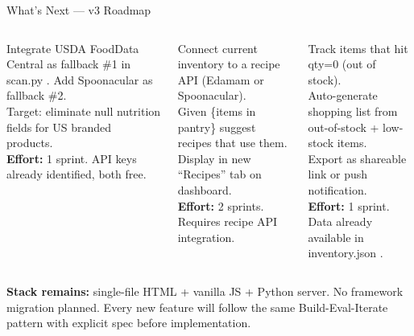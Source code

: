 \documentclass[aspectratio=169,12pt]{beamer}
\newcommand{\codebox}[1]{%
  \colorbox{cardBg}{\small\ttfamily #1}%
}
\begin{document}
\begin{frame}[t,shrink=25]{What's Next --- v3 Roadmap}
  \begin{columns}[T]
      \begin{tcolorbox}[pantrybox,title={Nutrition Enrichment}]
        {\footnotesize
        Integrate USDA FoodData Central as fallback \#1 in \codebox{scan.py}.
        Add Spoonacular as fallback \#2.\\[4pt]
        Target: eliminate null nutrition fields for US branded products.\\[4pt]
        \textbf{Effort:} 1 sprint. API keys already identified, both free.
        }
      \end{tcolorbox}

      \begin{tcolorbox}[pantrybox,title={Recipe Database}]
        {\footnotesize
        Connect current inventory to a recipe API (Edamam or Spoonacular).\\[4pt]
        Given \{items in pantry\} \textrightarrow{} suggest recipes that use them.\\[4pt]
        Display in new ``Recipes'' tab on dashboard.\\[4pt]
        \textbf{Effort:} 2 sprints. Requires recipe API integration.
        }
      \end{tcolorbox}

      \begin{tcolorbox}[pantrybox,title={Shopping List}]
        {\footnotesize
        Track items that hit qty=0 (out of stock).\\[4pt]
        Auto-generate shopping list from out-of-stock + low-stock items.\\[4pt]
        Export as shareable link or push notification.\\[4pt]
        \textbf{Effort:} 1 sprint. Data already available in \codebox{inventory.json}.
        }
      \end{tcolorbox}
  \end{columns}
  \vspace{0.4cm}
  \begin{center}
    \begin{tcolorbox}[colback=cardBg,colframe=sage,boxrule=0.8pt,arc=5pt,
        left=10pt,right=10pt,top=5pt,bottom=5pt,width=0.85\textwidth]
      {\small\color{bodyText}
        \textbf{Stack remains:} single-file HTML + vanilla JS + Python server.
        No framework migration planned.
        Every new feature will follow the same Build-Eval-Iterate pattern with
        explicit spec before implementation.
      }
    \end{tcolorbox}
  \end{center}
\end{frame}
\end{document}

